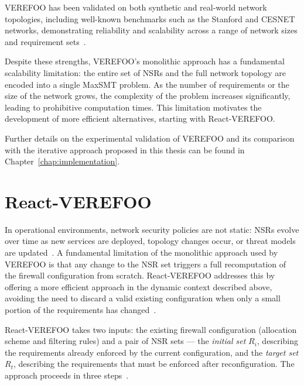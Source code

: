 VEREFOO has been validated on both synthetic and real-world network topologies, including well-known benchmarks such as the Stanford and CESNET networks, demonstrating reliability and scalability across a range of network sizes and requirement sets~\cite{verefoo}.

Despite these strengths, VEREFOO's monolithic approach has a fundamental scalability limitation: the entire set of NSRs and the full network topology are encoded into a single MaxSMT problem. As the number of requirements or the size of the network grows, the complexity of the problem increases significantly, leading to prohibitive computation times. This limitation motivates the development of more efficient alternatives, starting with React-VEREFOO.

Further details on the experimental validation of VEREFOO and its comparison with the iterative approach proposed in this thesis can be found in Chapter~\ref{chap:implementation}.

\section{React-VEREFOO}

In operational environments, network security policies are not static: NSRs evolve over time as new services are deployed, topology changes occur, or threat models are updated~\cite{autonomous}. A fundamental limitation of the monolithic approach used by VEREFOO is that any change to the NSR set triggers a full recomputation of the firewall configuration from scratch. React-VEREFOO addresses this by offering a more efficient approach in the dynamic context described above, avoiding the need to discard a valid existing configuration when only a small portion of the requirements has changed~\cite{reactverefoo}.

React-VEREFOO takes two inputs: the existing firewall configuration (allocation scheme and filtering rules) and a pair of NSR sets — the \textit{initial set} $R_i$, describing the requirements already enforced by the current configuration, and the \textit{target set} $R_t$, describing the requirements that must be enforced after reconfiguration. The approach proceeds in three steps~\cite{reactverefoo}.

